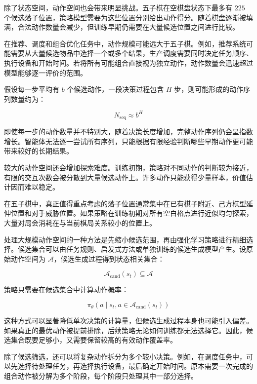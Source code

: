 \documentclass[UTF8,a4paper,zihao=-4,oneside,openany]{ctexbook}
\begin{document}
除了状态空间，动作空间也会带来明显挑战。五子棋在空棋盘状态下最多有 $225$ 个候选落子位置，策略模型需要为这些位置分别给出动作得分。随着棋盘逐渐被填满，合法动作数量会减少，但训练早期仍需要在大量候选位置之间进行比较。

在推荐、调度和组合优化任务中，动作规模可能远大于五子棋。例如，推荐系统可能需要从大量候选物品中选择一个或多个结果，生产调度需要同时决定任务顺序、执行设备和开始时间。若将所有可能组合直接视为独立动作，动作数量会迅速超过模型能够逐一评价的范围。

假设每一步平均有 $b$ 个候选动作，一段决策过程包含 $H$ 步，则可能形成的动作序列数量约为：

\begin{equation}
N_{\mathrm{seq}}
\approx
b^H
\end{equation}

即使每一步的动作数量并不特别大，随着决策长度增加，完整动作序列仍会呈指数增长。智能体无法逐一尝试所有序列，只能根据有限经验判断哪些早期动作更可能带来较好的长期结果。

较大的动作空间还会增加探索难度。训练初期，策略对不同动作的判断较为接近，有限的交互次数会被分散到大量候选动作上。许多动作只能获得少量样本，价值估计因而难以稳定。

在五子棋中，真正值得重点考虑的落子位置通常集中在已有棋子附近、己方棋型延伸位置和对手威胁位置。如果策略在训练初期对所有空白格点进行近似均匀探索，大量对局会消耗在与当前棋局关系较小的位置上。

处理大规模动作空间的一种方法是先缩小候选范围，再由强化学习策略进行精细选择。候选集合可以由任务规则、启发式方法或单独训练的候选生成模型产生。设原始动作空间为 $\mathcal{A}$，候选生成过程得到状态相关集合：

\begin{equation}
\mathcal{A}_{\mathrm{cand}}(s_t)
\subseteq
\mathcal{A}
\end{equation}

策略只需要在候选集合中计算动作概率：

\begin{equation}
\pi_{\theta}
\left(
a\mid s_t,
a\in\mathcal{A}_{\mathrm{cand}}(s_t)
\right)
\end{equation}

这种方式可以显著降低单次决策的计算量，但候选生成过程本身也可能引入偏差。如果真正的最优动作被提前排除，后续策略无论如何训练都无法选择它。因此，候选集合既要足够小，又需要保留较高的有效动作覆盖率。


除了候选筛选，还可以将复杂动作拆分为多个较小决策。例如，在调度任务中，可以先选择待处理任务，再选择执行设备，最后确定开始时间。原本需要一次完成的组合动作被分解为多个阶段，每个阶段只处理其中一部分选择。
\end{document}
